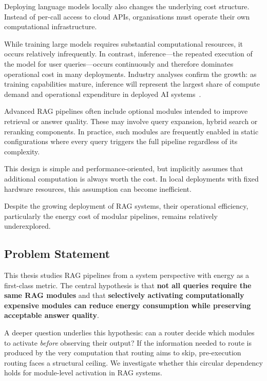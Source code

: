 Deploying language models locally also changes the underlying cost
structure. Instead of per-call access to cloud APIs,
organisations must operate their own computational infrastructure.

While training large models requires substantial computational resources,
it occurs relatively infrequently. In contrast, inference---the repeated
execution of the model for user queries---occurs continuously and therefore
dominates operational cost in many deployments. Industry analyses confirm
the growth: as training capabilities mature, inference will represent the
largest share of compute demand and operational expenditure in deployed
AI systems~\cite{inferenceshift2025, morganstanleyinference2025}.

Advanced RAG pipelines often include optional modules intended to improve
retrieval or answer quality. These may involve query expansion,
hybrid search or reranking components. In practice, such modules are
frequently enabled in static configurations where every query triggers
the full pipeline regardless of its complexity.

This design is simple and performance-oriented, but implicitly assumes that
additional computation is always worth the cost. In local deployments with
fixed hardware resources, this assumption can become inefficient.

Despite the growing deployment of RAG systems, their operational efficiency,
particularly the energy cost of modular pipelines, remains relatively
underexplored.

\subsection{Problem Statement}

This thesis studies RAG pipelines from a system perspective with energy as
a first-class metric. The central hypothesis is that \textbf{not all queries
require the same RAG modules} and that \textbf{selectively activating
computationally expensive modules can reduce energy consumption while
preserving acceptable answer quality}.

A deeper question underlies this hypothesis: can a router decide which
modules to activate \emph{before} observing their output?  If the
information needed to route is produced by the very computation that
routing aims to skip, pre-execution routing faces a structural ceiling.
We investigate whether this circular dependency holds for module-level
activation in RAG systems.


